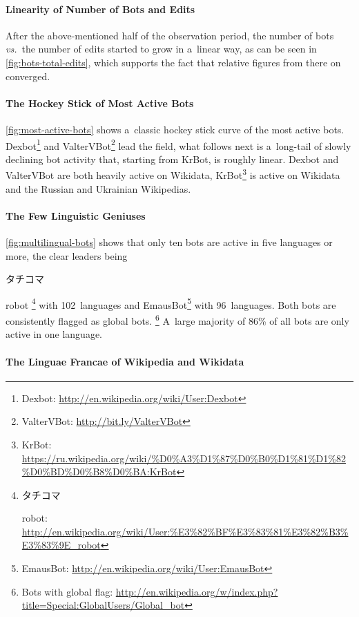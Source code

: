 \documentclass{sig-alternate}
\newcommand{\inlinelistingsize}{\fontsize{8pt}{11pt}}
\let\oldurl\url
\renewcommand{\url}[1]{\inlinelistingsize\oldurl{#1}}
\begin{document}
\paragraph{Linearity of Number of Bots and Edits}

After the above-mentioned half of the observation period,
the number of bots \emph{vs.}\ the number of edits
started to grow in a~linear way, as can be seen in \autoref{fig:bots-total-edits}, which supports the fact that
relative figures from there on converged.

\paragraph{The Hockey Stick of Most Active Bots}

\autoref{fig:most-active-bots} shows a~classic hockey stick
curve of the most active bots.
Dexbot\footnote{Dexbot: \url{http://en.wikipedia.org/wiki/User:Dexbot}}
and ValterVBot\footnote{ValterVBot: \url{http://bit.ly/ValterVBot}} lead the field,
what follows next is a~long-tail of slowly declining bot activity
that, starting from KrBot, is roughly linear.
Dexbot and ValterVBot are both heavily active on Wikidata,
KrBot\footnote{KrBot: \url{https://ru.wikipedia.org/wiki/\%D0\%A3\%D1\%87\%D0\%B0\%D1\%81\%D1\%82\%D0\%BD\%D0\%B8\%D0\%BA:KrBot}}
is active on Wikidata and the Russian and Ukrainian Wikipedias.

\paragraph{The Few Linguistic Geniuses}

\autoref{fig:multilingual-bots} shows that only ten bots
are active in five languages or more, the clear leaders
being \begin{CJK}{UTF8}{min}タチコマ\end{CJK} robot%
\footnote{\begin{CJK}{UTF8}{min}タチコマ\end{CJK} robot:
\url{http://en.wikipedia.org/wiki/User:\%E3\%82\%BF\%E3\%83\%81\%E3\%82\%B3\%E3\%83\%9E_robot}} with 102~languages and
EmausBot\footnote{EmausBot:
\url{http://en.wikipedia.org/wiki/User:EmausBot}}
with 96~languages.
Both bots are consistently flagged as global bots.%
\footnote{Bots with global flag: \url{http://en.wikipedia.org/w/index.php?title=Special:GlobalUsers/Global_bot}}
A~large majority of 86\% of all bots are only active in one language.

\paragraph{The Linguae Francae of Wikipedia and Wikidata}
\end{document}
